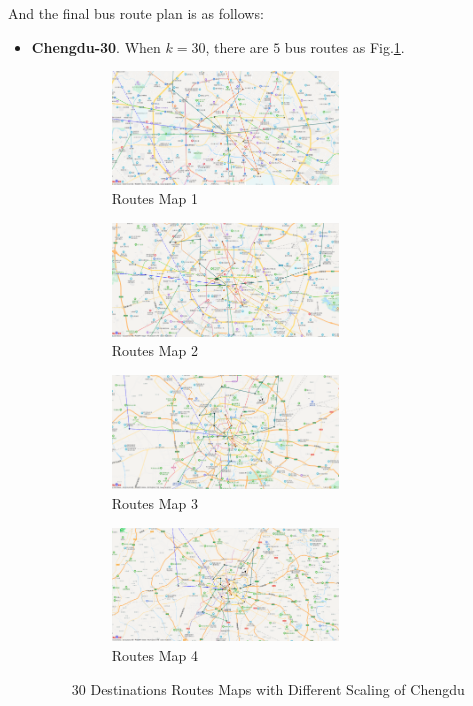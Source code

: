 \documentclass{llncs}
\begin{document}
And the final bus route plan is as follows:
\begin{itemize}
	\item \textbf{Chengdu-30}. When $k=30$, there are $5$ bus routes as Fig.\ref{fig-cd-30}.
	
	\begin{figure}[htbp]
		\centering
		\begin{subfigure}[t]{0.45\textwidth}
			\begin{minipage}{6cm}
				\centering
				\includegraphics[width=6cm]{figures/cd_30_1.png}
				\caption{Routes Map 1}
			\end{minipage}%
		\end{subfigure}
		\begin{subfigure}[t]{0.45\textwidth}
			\begin{minipage}{6cm}
				\centering
				\includegraphics[width=6cm]{figures/cd_30_2.png}
				\caption{Routes Map 2}
			\end{minipage}
		\end{subfigure}
		\begin{subfigure}[t]{0.45\textwidth}
			\begin{minipage}{6cm}
				\centering
				\includegraphics[width=6cm]{figures/cd_30_3.png}
				\caption{Routes Map 3}
			\end{minipage}%
		\end{subfigure}
		\begin{subfigure}[t]{0.45\textwidth}
			\begin{minipage}{6cm}
				\centering
				\includegraphics[width=6cm]{figures/cd_30_4.png}
				\caption{Routes Map 4}
			\end{minipage}
		\end{subfigure}
		\caption{$30$ Destinations Routes Maps with Different Scaling of Chengdu}
		\label{fig-cd-30}
	\end{figure}


\end{itemize}
\end{document}
